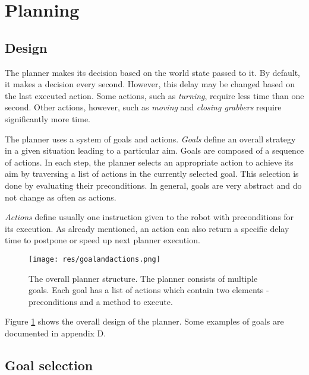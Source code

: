 \section{Planning}

\subsection{Design}

The planner makes its decision based on the world state passed to it. By default, it makes a decision every second. However, this delay may be changed based on the last executed action. Some actions, such as \emph{turning}, require less time than one second. Other actions, however, such as \emph{moving} and \emph{closing grabbers} require significantly more time.


The planner uses a system of goals and actions. \emph{Goals} define an overall strategy in a given situation leading to a particular aim. Goals are composed of a sequence of actions. In each step, the planner selects an appropriate action to achieve its aim by traversing a list of actions in the currently selected goal. This selection is done by evaluating their preconditions. In general, goals are very abstract and do not change as often as actions.

\emph{Actions} define usually one instruction given to the robot with preconditions for its execution. As already mentioned, an action can also return a specific delay time to postpone or speed up next planner execution.



\begin{figure}[H]
	\begin{center}
    \texttt{[image: res/goalandactions.png]}
    \caption{The overall planner structure. The planner consists of multiple goals. Each goal has a list of actions which contain two elements - preconditions and a method to execute.}
    \label{fig:goalsandactionsstructure}
	\end{center}
\end{figure}

Figure \ref{fig:goalsandactionsstructure} shows the overall design of the planner. Some examples of goals are documented in appendix D.



\subsection{Goal selection}

